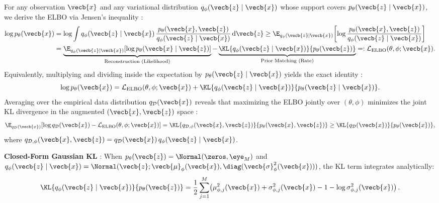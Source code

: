 \documentclass[../../../../master.tex]{subfiles}
\begin{document}
\begin{coremath}
For any observation $\vecb{x}$ and any variational distribution $q_\phi(\vecb{z} \mid \vecb{x})$ whose support covers $p_\theta(\vecb{z} \mid \vecb{x})$, we derive the ELBO via Jensen's inequality  :
\begin{align}
  \log p_\theta(\vecb{x})
  &= \log \int q_\phi(\vecb{z} \mid \vecb{x})\,\frac{p_\theta(\vecb{x}, \vecb{z})}{q_\phi(\vecb{z} \mid \vecb{x})}\,\mathrm{d}\vecb{z}
  \ge \E_{q_\phi(\vecb{z} \mid \vecb{x})}\!\left[\log \frac{p_\theta(\vecb{x}, \vecb{z})}{q_\phi(\vecb{z} \mid \vecb{x})}\right] \nonumber \\
  &= \underbrace{\E_{q_\phi(\vecb{z}\mid\vecb{x})}\!\left[\log p_\theta(\vecb{x}\mid\vecb{z})\right]}_{\text{Reconstruction (Likelihood)}}
  - \underbrace{\KL{q_\phi(\vecb{z}\mid\vecb{x})}{p_\theta(\vecb{z})}}_{\text{Prior Matching (Rate)}}
  =: \mathcal{L}_{\mathrm{ELBO}}(\theta, \phi; \vecb{x}). \label{eq:vae:elbo}
\end{align}
Equivalently, multiplying and dividing inside the expectation by $p_\theta(\vecb{z} \mid \vecb{x})$ yields the exact identity  :
\begin{equation}\label{eq:vae:elbo_gap}
  \log p_\theta(\vecb{x}) = \mathcal{L}_{\mathrm{ELBO}}(\theta, \phi; \vecb{x}) + \KL{q_\phi(\vecb{z}\mid\vecb{x})}{p_\theta(\vecb{z}\mid\vecb{x})}.
\end{equation}
Averaging over the empirical data distribution $q_{\mathcal{D}}(\vecb{x})$ reveals that maximizing the ELBO jointly over $(\theta,\phi)$ minimizes the joint KL divergence in the augmented $(\vecb{x},\vecb{z})$ space :
\begin{equation}\label{eq:vae:augmented_kl}
  \E_{q_{\mathcal{D}}(\vecb{x})}\!\left[\log q_{\mathcal{D}}(\vecb{x}) - \mathcal{L}_{\mathrm{ELBO}}(\theta, \phi; \vecb{x})\right]
  = \KL{q_{\mathcal{D},\phi}(\vecb{x}, \vecb{z})}{p_\theta(\vecb{x}, \vecb{z})}
  \ge \KL{q_{\mathcal{D}}(\vecb{x})}{p_\theta(\vecb{x})},
\end{equation}
where $q_{\mathcal{D},\phi}(\vecb{x}, \vecb{z}) = q_{\mathcal{D}}(\vecb{x})\,q_\phi(\vecb{z} \mid \vecb{x})$.

\textbf{Closed-Form Gaussian KL}  : When $p_\theta(\vecb{z}) = \Normal(\zeros, \eye_M)$ and $q_\phi(\vecb{z} \mid \vecb{x}) = \Normal(\vecb{z}; \vecb{\mu}_\phi(\vecb{x}), \diag(\vecb{\sigma}_\phi^2(\vecb{x})))$, the KL term integrates analytically:
\begin{equation}\label{eq:vae:gaussian_kl}
  \KL{q_\phi(\vecb{z}\mid\vecb{x})}{p_\theta(\vecb{z})}
  = \frac{1}{2}\sum_{j=1}^{M}\!\left( \mu_{\phi,j}^2(\vecb{x}) + \sigma_{\phi,j}^2(\vecb{x}) - 1 - \log \sigma_{\phi,j}^2(\vecb{x}) \right).
\end{equation}
\end{coremath}
\end{document}
